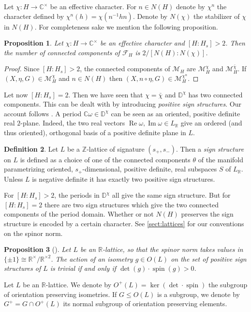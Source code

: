 \documentclass[a4paper]{amsart}
\theoremstyle{definition}
\newtheorem{definition}{Definition}[section]
\theoremstyle{plain}
\newtheorem{proposition}[definition]{Proposition}
\newcommand{\RR}{\mathbb{R}}
\newcommand{\CC}{\mathbb{C}}
\newcommand{\ZZ}{\mathbb{Z}}
\newcommand{\DD}{\mathbb{D}}
\newcommand{\M}{\mathcal{M}}
\newcommand{\F}{\mathcal{F}}
\newcommand{\re}{\operatorname{Re}}
\newcommand{\im}{\operatorname{Im}}
\DeclareMathOperator{\spin}{spin}
\begin{document}
Let $\chi: H \to \CC^\times$ be an effective character. For $n \in N(H)$ denote by
$\chi^n$ the character defined by $\chi^n(h) = \chi(n^{-1} h n)$.
Denote by $N(\chi)$ the stabilizer of $\chi$ in $N(H)$. For completeness sake we mention the following proposition.

\begin{proposition}
 Let $\chi \colon H \to \CC^\times$ be an effective character and $[H:H_s]>2$.
 Then the number of connected components of $\F_H$ is $2/[N(H):N(\chi)]$.
\end{proposition}
\begin{proof}
 Since $[H:H_s]>2$, the connected components of $\M_H$ are $\M_H^\chi$ and $\M_H^{\bar \chi}$. If $(X,\eta,G) \in \M_H^\chi$ and $n \in N(H)$ then $(X,n \circ \eta,G) \in \M_H^{\chi^n}$.
\end{proof}

Let now $[H:H_s]=2$. Then we have seen that $\chi=\bar \chi$ and $\DD^\chi$ has two connected components.
This can be dealt with by introducing \emph{positive sign structures}. Our account follows \cite{shimada2018}.
A period $\CC \omega \in \DD^\chi$ can be seen as an oriented, positive definite real $2$-plane. Indeed, the two real vectors $\re \omega, \im \omega \in L_\RR$ give an ordered (and thus oriented), orthogonal basis of a positive definite plane in $L$.

\begin{definition}
 Let $L$ be a $\ZZ$-lattice of signature $(s_+,s_-)$. Then a \emph{sign structure} on $L$ is defined as a choice of one of the connected components $\theta$ of the manifold parametrizing oriented, $s_+$-dimensional, positive definite, real subspaces $S$ of $L_\RR$. Unless $L$ is negative definite it has exactly two positive sign structures.
\end{definition}

For $[H:H_s]>2$, the periods in $\DD^\chi$ all give the same sign structure. But for $[H:H_s]=2$ there are two sign structures which give the two connected components of the period domain.
Whether or not $N(H)$ preserves the sign structure is encoded by a certain character. See \cref{sect:lattices} for our conventions on the spinor norm.
\begin{proposition}[\cite{looijenga-wahl1986,miranda-morrisonI}]
 Let $L$ be an $\RR$-lattice, so that the spinor norm takes values in $\{\pm 1\}\cong \RR^\times/\RR^{\times 2}$.
 The action of an isometry $g \in O(L)$ on the set of positive sign structures of $L$ is trivial if and only if $\det(g) \cdot \spin(g) > 0$.
\end{proposition}
Let $L$ be an $\RR$-lattice. We denote by $O^+(L)=\ker (\det \cdot \spin)$ the subgroup of orientation preserving isometries. If $G \leq O(L)$ is a subgroup, we denote by $G^+ = G \cap O^+(L)$ its normal subgroup of orientation preserving elements.
\end{document}
